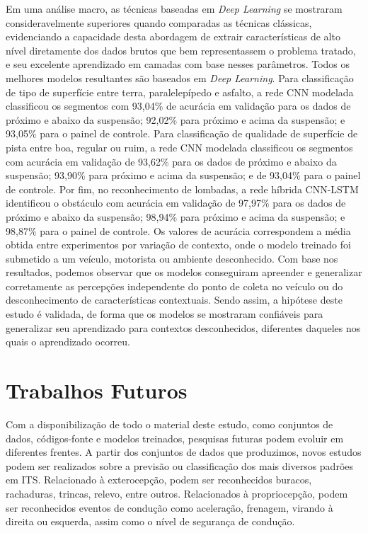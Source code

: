 Em uma análise macro, as técnicas baseadas em \textit{Deep Learning} se mostraram consideravelmente superiores quando comparadas as técnicas clássicas, evidenciando a capacidade desta abordagem de extrair características de alto nível diretamente dos dados brutos que bem representassem o problema tratado, e seu excelente aprendizado em camadas com base nesses parâmetros. Todos os melhores modelos resultantes são baseados em \textit{Deep Learning}. Para classificação de tipo de superfície entre terra, paralelepípedo e asfalto, a rede CNN modelada classificou os segmentos com 93,04\% de acurácia em validação para os dados de próximo e abaixo da suspensão; 92,02\% para próximo e acima da suspensão; e 93,05\% para o painel de controle. Para classificação de qualidade de superfície de pista entre boa, regular ou ruim, a rede CNN modelada classificou os segmentos com acurácia em validação de 93,62\% para os dados de próximo e abaixo da suspensão; 93,90\% para próximo e acima da suspensão; e de 93,04\% para o painel de controle. Por fim, no reconhecimento de lombadas, a rede híbrida CNN-LSTM identificou o obstáculo com acurácia em validação de 97,97\% para os dados de próximo e abaixo da suspensão; 98,94\% para próximo e acima da suspensão; e 98,87\% para o painel de controle. Os valores de acurácia correspondem a média obtida entre experimentos por variação de contexto, onde o modelo treinado foi submetido a um veículo, motorista ou ambiente desconhecido. Com base nos resultados, podemos observar que os modelos conseguiram apreender e generalizar corretamente as percepções independente do ponto de coleta no veículo ou do desconhecimento de características contextuais. Sendo assim, a hipótese deste estudo é validada, de forma que os modelos se mostraram confiáveis para generalizar seu aprendizado para contextos desconhecidos, diferentes daqueles nos quais o aprendizado ocorreu. 

\section{Trabalhos Futuros}

Com a disponibilização de todo o material deste estudo, como conjuntos de dados, códigos-fonte e modelos treinados, pesquisas futuras podem evoluir em diferentes frentes. A partir dos conjuntos de dados que produzimos, novos estudos podem ser realizados sobre a previsão ou classificação dos mais diversos padrões em ITS. Relacionado à exterocepção, podem ser reconhecidos buracos, rachaduras, trincas, relevo, entre outros. Relacionados à propriocepção, podem ser reconhecidos eventos de condução como aceleração, frenagem, virando à direita ou esquerda, assim como o nível de segurança de condução. 

